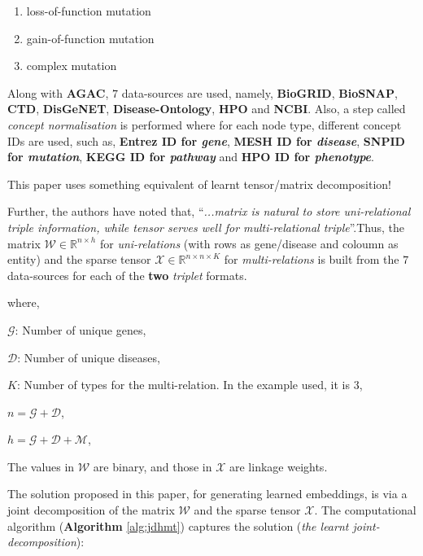 \begin{sloppypar*}
    \begin{enumerate}
        \item loss-of-function mutation
        \item gain-of-function mutation
        \item complex mutation
    \end{enumerate}

    \noindent Along with \textbf{AGAC}, $7$ data-sources are used, namely,
    \textbf{BioGRID}, \textbf{BioSNAP}, \textbf{CTD}, \textbf{DisGeNET},
    \textbf{Disease-Ontology}, \textbf{HPO} and \textbf{NCBI}. Also, a step called
    \textit{concept normalisation} is performed where for each node
    type, different concept IDs are used, such as, \textbf{Entrez ID for
    \textit{gene}}, \textbf{MESH ID for \textit{disease}}, \textbf{SNPID for
    \textit{mutation}}, \textbf{KEGG ID for \textit{pathway}} and \textbf{HPO ID
    for \textit{phenotype}}.

    \begin{mybox}
        This paper uses something equivalent of learnt tensor/matrix decomposition!
    \end{mybox}

    Further, the authors have noted that, ``\textit{...matrix is
    natural to store uni-relational triple information, while tensor serves well
    for multi-relational triple}''.Thus, the matrix $\mathcal{W} \in \mathbb{R}^{n \times h}$
    for \textit{uni-relations} (with rows as gene/disease and coloumn as entity)
    and the sparse tensor $\mathcal{X} \in \mathbb{R}^{n \times n \times K}$
    for \textit{multi-relations} is built from the $7$ data-sources for each of
    the \textbf{two} \textit{triplet} formats.

    \noindent where,

    $\mathcal{G}$: Number of unique genes,

    $\mathcal{D}$: Number of unique diseases,

    $K$: Number of types for the multi-relation. In the example used, it is $3$,

    $n = \mathcal{G} + \mathcal{D}$,

    $h = \mathcal{G} + \mathcal{D} + \mathcal{M}$,
    
    \noindent The values in $\mathcal{W}$ are binary, and those in $\mathcal{X}$
    are linkage weights.\hfill \newline

    The solution proposed in this paper, for generating learned embeddings, is via
    a joint decomposition of the matrix $\mathcal{W}$ and the sparse tensor $\mathcal{X}$.
    The computational algorithm (\textbf{Algorithm} \ref{alg:jdhmt})
    captures the solution (\textit{the learnt joint-decomposition}):


\end{sloppypar*}
